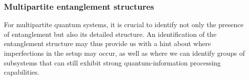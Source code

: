 \documentclass[
aps,
pra,
floatfix,
]{revtex4-2}
\theoremstyle{plain}
\theoremstyle{definition}
\newtheorem{remark}{Remark}
\newcommand{\dm}{\rho}
\begin{document}



\subsubsection{Multipartite entanglement structures}
For multipartite quantum systems, it is crucial to identify not only the presence of entanglement but also its detailed structure.
An identification of the entanglement structure may thus provide us with a hint about where imperfections in the setup may occur, as well as where we can identify groups of subsystems that can still exhibit strong quantum-information processing capabilities.
\end{document}
